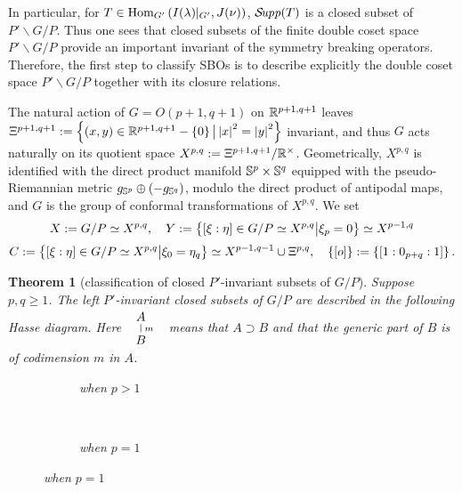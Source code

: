 \documentclass[12pt]{article} %
\newtheorem{theorem}{Theorem}
\newcommand{\Hom}{\mbox{\normalfont Hom}}
\newcommand{\Supp}{\mathcal{S}\!{\it upp}}
\theoremstyle{definition}
\theoremstyle{exampstyle} \newtheorem{examp}[theorem]{Theorem}
\newcommand{\IlambdaGprime}{I(\lambda)\kern-0.3em\mid_{G'}}
\newcommand{\SBO}{\Hom_{G'}\left(\IlambdaGprime,J(\nu) \right)}
\renewcommand{\setminus}{-}
\begin{document}
In particular, for $T\in\SBO$, $\Supp(T)$ is a closed subset of $P'\backslash G/P$.
Thus one sees that closed subsets of the finite double coset space $P'\backslash G/P$ provide an important invariant of the symmetry breaking operators. Therefore,
the first step to classify SBOs is to describe explicitly the double coset space $P'\backslash G/P$ together with its closure relations.

The natural action of $G=O(p+1,q+1)$ on $\mathbb{R}^{p+1,q+1}$ leaves
$\Xi^{p+1,q+1}:=\mysetn{(x,y)\in\R^{p+1,q+1}\setminus\left\{ 0 \right\}}{\myabs{x}^2=\myabs{y}^2}$ invariant, and thus $G$ acts naturally on its quotient space
$X^{p,q}:=\Xi^{p+1,q+1}/\mathbb{R}^{\times}$. 
Geometrically, $X^{p,q}$ is identified with the direct product manifold $\mathbb{S}^p\times\mathbb{S}^q$ equipped with the pseudo-Riemannian metric $g_{\mathbb{S}^p}\oplus \left( -g_{\mathbb{S}^q} \right)$,
modulo the direct product of antipodal maps, and $G$ is the group of conformal transformations of $X^{p,q}$.
We set
\[
	X:=G/P\simeq X^{p,q},\quad Y:=\left\{[\xi:\eta]\in G/P\simeq X^{p,q}\big| \xi_{p}=0\right\}\simeq X^{p-1,q}\]
	\[C:=\left\{[\xi:\eta]\in G/P\simeq X^{p,q}\big| \xi_{0}=\eta_q\right\}\simeq X^{p-1,q-1}\cup\Xi^{p,q},\quad\left\{ [o] \right\}:=\left\{ [1:0_{p+q}:1] \right\}.\]
\begin{theorem}[classification of closed $P'$-invariant subsets of $G/P$]
	Suppose $p,q\ge1$.
	The left $P'$-invariant closed subsets of $G/P$ are described in the following Hasse diagram. Here 
	$
	\begin{array}{l}
	        \xymatrixrowsep{0.5pc}
		\xymatrix{A\ar@{-}[d]^m\\B}
	\end{array}
	$
	means that $A\supset B$ and that the generic part of $B$ is of codimension $m$ in $A$.\\
  \begin{figure}[H]
    \centering
    \begin{subfigure}[t]{0.3\textwidth}
	    \xymatrixrowsep{0.5pc}
	\caption{when $p>1$}
    \end{subfigure}
    ~ %
    \begin{subfigure}[t]{0.3\textwidth}
	    \xymatrixrowsep{0.5pc}
	    {}
	\caption{when $p=1$}
    \end{subfigure}
\end{figure}
\end{theorem}
\end{document}
